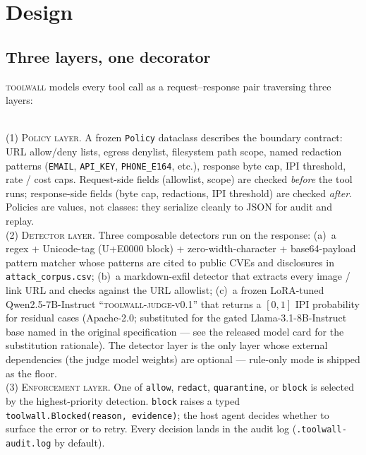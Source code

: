 \section{Design}
\label{sec:design}

\subsection{Three layers, one decorator}

\textsc{toolwall} models every tool call as a request--response
pair traversing three layers:

\medskip
\noindent\hrulefill\\[2pt]
\textsc{(1) Policy layer.} A frozen \verb|Policy| dataclass
describes the boundary contract: URL allow/deny lists, egress
denylist, filesystem path scope, named redaction patterns
(\verb|EMAIL|, \verb|API_KEY|, \verb|PHONE_E164|, etc.), response
byte cap, IPI threshold, rate / cost caps. Request-side fields
(allowlist, scope) are checked \emph{before} the tool runs;
response-side fields (byte cap, redactions, IPI threshold) are
checked \emph{after}. Policies are values, not classes: they
serialize cleanly to JSON for audit and replay.
\\[2pt]
\textsc{(2) Detector layer.} Three composable detectors run on
the response: (a)~a regex + Unicode-tag (U+E0000 block) +
zero-width-character + base64-payload pattern matcher whose
patterns are cited to public CVEs and disclosures in
\texttt{attack\_corpus.csv}; (b)~a markdown-exfil detector that
extracts every image / link URL and checks against the URL
allowlist; (c)~a frozen LoRA-tuned Qwen2.5-7B-Instruct
``\textsc{toolwall-judge-v0.1}'' that returns a $[0,1]$ IPI
probability for residual cases (Apache-2.0; substituted for the
gated Llama-3.1-8B-Instruct base named in the original
specification --- see the released model card for the
substitution rationale). The detector layer is the only
layer whose external dependencies (the judge model weights) are
optional --- rule-only mode is shipped as the floor.
\\[2pt]
\textsc{(3) Enforcement layer.} One of \verb|allow|, \verb|redact|,
\verb|quarantine|, or \verb|block| is selected by the highest-priority
detection. \verb|block| raises a typed
\verb|toolwall.Blocked(reason, evidence)|; the host agent decides
whether to surface the error or to retry. Every decision lands in
the audit log (\verb|.toolwall-audit.log| by default).
\\[2pt]
\noindent\hrulefill

